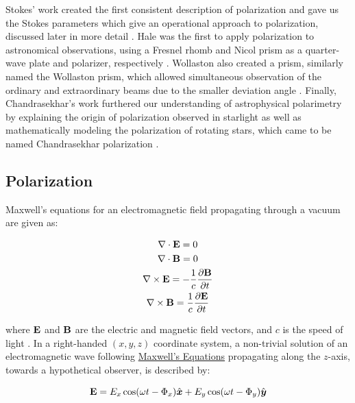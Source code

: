 Stokes' work created the first consistent description of polarization and gave us the Stokes parameters which give an operational approach to polarization, discussed later in more detail \citep{Stokes}. Hale was the first to apply polarization to astronomical observations, using a Fresnel rhomb and Nicol prism as a quarter-wave plate and polarizer, respectively \citep{Hale_pre,Hale_post}. Wollaston also created a prism, similarly named the Wollaston prism, which allowed simultaneous observation of the ordinary and extraordinary beams due to the smaller deviation angle \citep{WollPrism}. Finally, Chandrasekhar's work furthered our understanding of astrophysical polarimetry by explaining the origin of polarization observed in starlight as well as mathematically modeling the polarization of rotating stars, which came to be named Chandrasekhar polarization \citep{chandrasekhar}.

\subsection{Polarization}\label{subsec:pol}

Maxwell's equations for an electromagnetic field propagating through a vacuum are given as:

\begin{equation}
  \begin{gathered}
    \nabla \cdot \mathbf{E} = 0 \\
    \nabla \cdot \mathbf{B} = 0 \\
    \nabla \times \mathbf{E} = - \frac{1}{c} \frac{\partial \mathbf{B}}{\partial t} \\
    \nabla \times \mathbf{B} = \frac{1}{c} \frac{\partial \mathbf{E}}{\partial t}
  \end{gathered}
  \label{eq:Maxwell}
\end{equation}

\noindent where $\mathbf{E}$ and $\mathbf{B}$ are the electric and magnetic field vectors, and $c$ is the speed of light \citep{Griffiths}. In a right-handed $(x, y, z)$ coordinate system, a non-trivial solution of an electromagnetic wave following \hyperref[eq:Maxwell]{Maxwell's Equations} propagating along the $z$-axis, towards a hypothetical observer, is described by:

\begin{equation}
  \mathbf{E} = E_{x} \cos(\omega t - \Phi_{x}) \hat{\boldsymbol{x}} +
  E_{y} \cos(\omega t - \Phi_{y}) \hat{\boldsymbol{y}}
  \label{eq:Maxwell_sol}
\end{equation}


